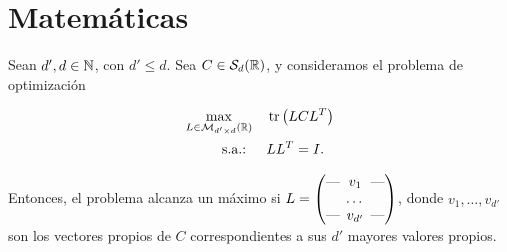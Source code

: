 \documentclass{book}
\begin{document}


\setcounter{tocdepth}{1}

\thispagestyle{plain}
\tableofcontents
\vspace*{\fill}
\doclicenseThis
\newpage
\thispagestyle{plain}


\part{Matemáticas}


\begin{comment}
\begin{prop}[Caracterizaciones de distancias asociadas a métricas] \label{prop:caract_distancias}
	
\end{prop}
\end{comment}

\begin{thm} \label{thm:eigen_trace_opt}
	Sean $d',d \in \mathbb{N} $, con $d' \le d$. Sea $C \in \mathcal{S}_d(\mathbb{R})$, y consideramos el problema de optimización
	
	\begin{align*}
	\max_{L \in \mathcal{M}_{d'\times d}(\mathbb{R})} &\quad \operatorname{tr}\left(LCL^T\right)  \\
	\text{s.a.: } &\quad LL^T = I.
	\end{align*}
	
	Entonces, el problema alcanza un máximo si $L = \begin{pmatrix}
	\text{---} \hspace{-0.2cm} & v_1 & \hspace{-0.2cm} \text{---} \\
	& \dots &  \\
	\text{---} \hspace{-0.2cm} & v_{d'} & \hspace{-0.2cm} \text{---}
	\end{pmatrix}$, donde $v_1,\dots,v_{d'}$ son los vectores propios de $C$ correspondientes a sus $d'$ mayores valores propios.
	
	
\end{thm}
\end{document}
